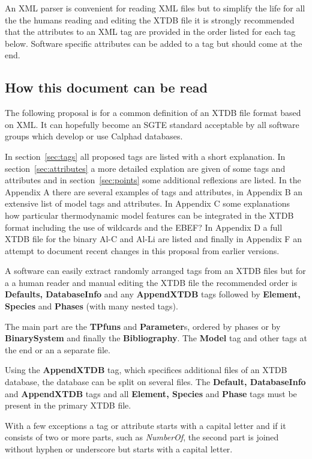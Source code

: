 \documentclass{article}
\begin{document}
An XML parser is convenient for reading XML files but to simplify the
life for all the the humans reading and editing the XTDB file it is
strongly recommended that the attributes to an XML tag are provided in
the order listed for each tag below.  Software specific attributes can
be added to a tag but should come at the end.

\subsection{How this document can be read}

The following proposal is for a common definition of an XTDB file
format based on XML.  It can hopefully become an SGTE standard
acceptable by all software groups which develop or use Calphad
databases.

In section~\ref{sec:tags} all proposed tags are listed with a short
explanation.  In section~\ref{sec:attributes} a more detailed
explation are given of some tags and attributes and in
section~\ref{sec:points} some additional reflexions are listed.  In
the Appendix A there are several examples of tags and attributes, in
Appendix B an extensive list of model tags and attributes.  In
Appendix C some explanations how particular thermodynamic model
features can be integrated in the XTDB format including the use of
wildcards and the EBEF?  In Appendix D a full XTDB file for the binary
Al-C and Al-Li are listed and finally in Appendix F an attempt to
document recent changes in this proposal from earlier versions.

A software can easily extract randomly arranged tags from an XTDB
files but for a a human reader and manual editing the XTDB file the
recommended order is {\bf Defaults, DatabaseInfo} and any {\bf
  AppendXTDB} tags followed by {\bf Element, Species} and {\bf
  Phases} (with many nested tags).

The main part are the {\bf TPfuns} and {\bf Parameter}s, ordered by
phases or by {\bf BinarySystem} and finally the {\bf Bibliography}.
The {\bf Model} tag and other tags at the end or an a separate file.

Using the {\bf AppendXTDB} tag, which specifices additional files of
an XTDB database, the database can be split on several files.  The
{\bf Default, DatabaseInfo} and {\bf AppendXTDB} tags and all {\bf
  Element, Species} and {\bf Phase} tags must be present in the
primary XTDB file.

With a few exceptions a tag or attribute starts with a capital letter
and if it consists of two or more parts, such as {\em NumberOf}, the
second part is joined without hyphen or underscore but starts with a
capital letter.
\end{document}
